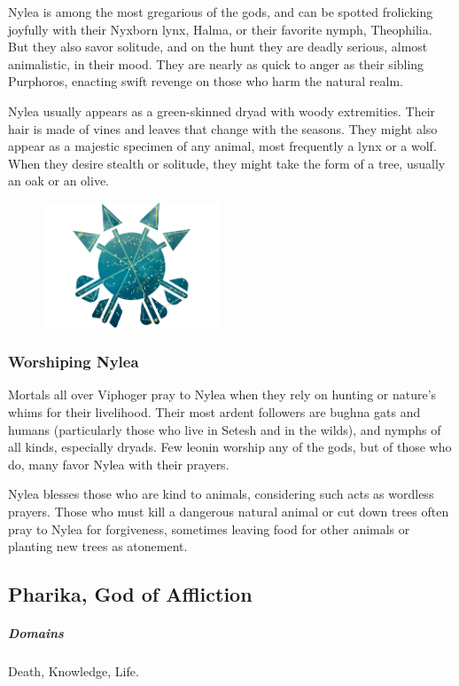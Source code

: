     Nylea is among the most gregarious of the gods, and can be spotted frolicking joyfully with their Nyxborn lynx, Halma, or their favorite nymph, Theophilia.
    But they also savor solitude, and on the hunt they are deadly serious, almost animalistic, in their mood.
    They are nearly as quick to anger as their sibling Purphoros, enacting swift revenge on those who harm the natural realm.

    Nylea usually appears as a green-skinned dryad with woody extremities.
    Their hair is made of vines and leaves that change with the seasons.
    They might also appear as a majestic specimen of any animal, most frequently a lynx or a wolf.
    When they desire stealth or solitude, they might take the form of a tree, usually an oak or an olive.

    \begin{figure}[b]
        \centering
        \includegraphics[width=0.47\textwidth]{02viphoger/img/10s_nylea.png}
    \end{figure}

    \subsubsection{Worshiping Nylea}
        Mortals all over Viphoger pray to Nylea when they rely on hunting or nature's whims for their livelihood.
        Their most ardent followers are bughna gats and humans (particularly those who live in Setesh and in the wilds), and nymphs of all kinds, especially dryads.
        Few leonin worship any of the gods, but of those who do, many favor Nylea with their prayers.

        Nylea blesses those who are kind to animals, considering such acts as wordless prayers.
        Those who must kill a dangerous natural animal or cut down trees often pray to Nylea for forgiveness, sometimes leaving food for other animals or planting new trees as atonement.

\pagebreak

\subsection*{Pharika, God of Affliction} \label{ssec::pharika}
    \subparagraph{Domains} Death, Knowledge, Life.

